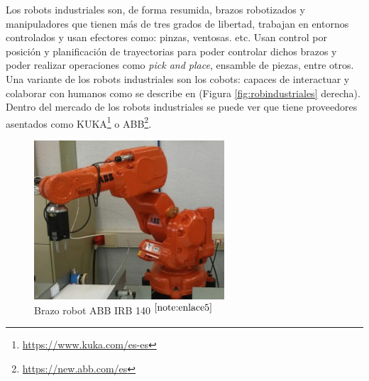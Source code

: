 Los robots industriales son, de forma resumida, brazos robotizados y manipuladores que tienen más de tres grados de libertad, trabajan en entornos controlados y usan efectores como: pinzas, ventosas. etc. Usan control por posición y planificación de trayectorias para poder controlar dichos brazos y poder realizar operaciones como \textit{pick and place}, ensamble de piezas, entre otros. Una variante de los robots industriales son los cobots: capaces de interactuar y colaborar con humanos como se describe en  \cite{ELZAATARI2019162} (Figura \ref{fig:robindustriales} derecha). Dentro del mercado de los robots industriales se puede ver que tiene proveedores asentados como KUKA\footnote{\url{https://www.kuka.com/es-es}} o ABB\footnote{\url{https://new.abb.com/es}}.

\begin{figure}[ht!]
	\centering
	\begin{minipage}{0.44\linewidth}
		\centering
		\includegraphics[width=\linewidth]{figs/brazoIRB140.png}
		\caption*{\centering Brazo robot ABB IRB 140 $^{\ref{note:enlace5}}$}


\end{minipage}
\end{figure}
